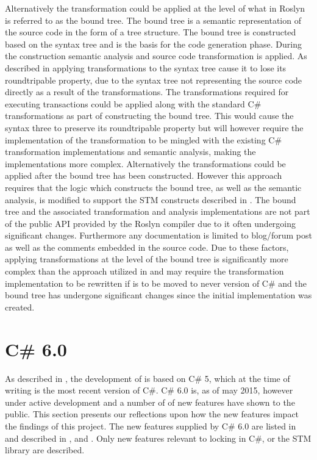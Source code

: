 Alternatively the transformation could be applied at the level of what in Roslyn is referred to as the bound tree. The bound tree is a semantic representation of the source code in the form of a tree structure. The bound tree is constructed based on the syntax tree and is the basis for the code generation phase. During the construction semantic analysis and source code transformation is applied. As described in  applying transformations to the syntax tree cause it to lose its roundtripable property, due to the syntax tree not representing the source code directly as a result of the transformations. The transformations required for executing transactions could be applied along with the standard C\# transformations as part of constructing the bound tree. This would cause the syntax three to preserve its roundtripable property but will however require the implementation of the transformation to be mingled with the existing C\# transformation implementations and semantic analysis, making the implementations more complex. Alternatively the transformations could be applied after the bound tree has been constructed. However this approach requires that the logic which constructs the bound tree, as well as the semantic analysis, is modified to support the \ac{STM} constructs described in . The bound tree and the associated transformation and analysis implementations are not part of the public \ac{API} provided by the Roslyn compiler due to it often undergoing significant changes\cite{roslynBinder}. Furthermore any documentation is limited to blog/forum post as well as the comments embedded in the source code. Due to these factors, applying transformations at the level of the bound tree is significantly more complex than the approach utilized in  and may require the transformation implementation to be rewritten if \stmname is to be moved to never version of C\# and the bound tree has undergone significant changes since the initial implementation was created.

\section{C\# 6.0}\label{sec:reflection_csharpsix}
As described in , the development of \stmname is based on C\# 5, which at the time of writing is the most recent version of C\#. C\# 6.0 is, as of may 2015, however under active development and a number of of new features have shown to the public. This section presents our reflections upon how the new features impact the findings of this project. The new features supplied by C\# 6.0 are listed in \cite{csharp6Features} and described in \cite{csharp6one}, \cite{csharp6two} and \cite{csharp6featureDescription}. Only new features relevant to locking in C\#, \stmname or the \ac{STM} library are described. 

